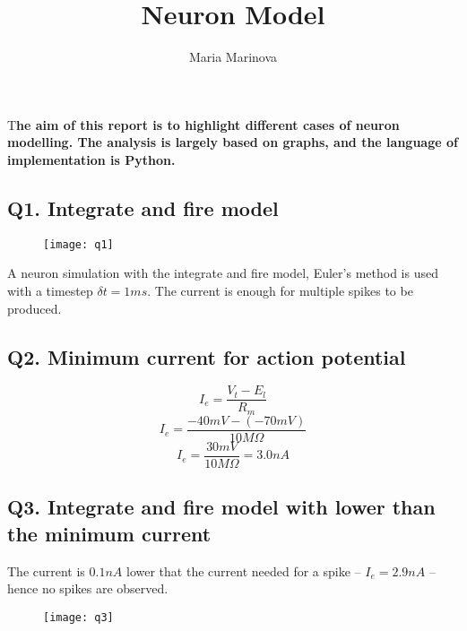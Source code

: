 \documentclass[DIV=calc, paper=a4, fontsize=12pt, twocolumn]{article}	 %
\title{Neuron Model} %
\author{Maria Marinova} %
\date{\vspace{-30pt}} %
\newcommand{\initial}[1]{ %
	\lettrine[lines=3,lhang=0.3,nindent=0em]{
		\color{Teal}
		{\textsf{#1}}}{}}
\begin{document}
	
	\maketitle %
	
	\thispagestyle{fancy} %
	
	
	\initial{T}\textbf{he aim of this report is to highlight different cases of neuron modelling. The analysis is largely based on graphs, and the language of implementation is Python.}
	
	\vfill
	\subsection*{Q1. Integrate and fire model}
		\begin{figure}[H]
			\texttt{[image: q1]}
		\end{figure}
	
	A neuron simulation with the integrate and fire model, Euler's method is used with a timestep $\delta t = 1 ms$. The current is enough for multiple spikes to be produced.
	\vfill
		
	\subsection*{Q2. Minimum current for action potential}
		\begin{equation}
			I_e = \dfrac{V_t - E_l}{R_m}
		\end{equation}
		\begin{equation}
			I_e = \dfrac{-40 mV - (-70 mV)}{10M\Omega}
		\end{equation}
		\begin{equation}
			I_e = \dfrac{30 mV}{10M\Omega} = 3.0 nA
		\end{equation}
	\vfill
		
	\subsection*{Q3. Integrate and fire model with lower than the minimum current}
	The current is $0.1 nA$ lower that the current needed for a spike -- $I_e = 2.9 nA$ -- hence no spikes are observed.
		\begin{figure}[H]
			\texttt{[image: q3]}
		\end{figure}
	\vfill	
		
\end{document}
